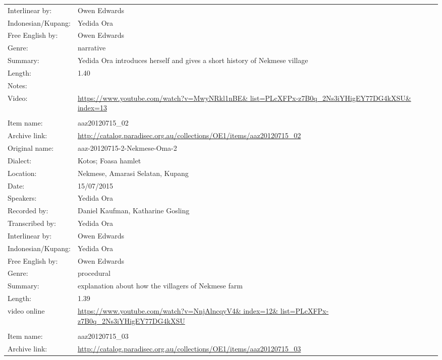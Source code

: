 \begin{longtable}{lL{.67\textwidth}}
Interlinear by:		& Owen Edwards \\
Indonesian/Kupang:		& Yedida Ora \\
Free English by:		& Owen Edwards \\
Genre:				& narrative \\
\clearpage
Summary:				& Yedida Ora introduces herself and gives a short history of Nekmese{\Q} village \\
Length:				& 1.40 \\
Notes:				& \\
Video: & \url{https://www.youtube.com/watch?v=MwyNRkl1nBE& list=PLcXFPx-z7B0q_2Ns3iYHigEY77DG4kXSU& index=13} \\ \lspbottomrule
{}			& \\
Item name:			& aaz20120715{\_}02\\
Archive link:			& \url{http://catalog.paradisec.org.au/collections/OE1/items/aaz20120715_02}\\
Original name:			& aaz-20120715-2-Nekmese-Oma-2\\
Dialect:				& Kotos; Fo{\Q}asa{\Q} hamlet \\
Location:				& Nekmese{\Q}, Amarasi Selatan, Kupang \\
Date:				& 15/07/2015 \\
Speakers:				& Yedida Ora \\
Recorded by:			& Daniel Kaufman, Katharine Gosling \\
Transcribed by:		& Yedida Ora \\
Interlinear by:		& Owen Edwards \\
Indonesian/Kupang:		& Yedida Ora \\
Free English by:		& Owen Edwards \\
Genre:				& procedural \\
Summary:				& explanation about how the villagers of Nekmese{\Q} farm\\
Length:				& 1.39\\
video online & \url{https://www.youtube.com/watch?v=NnjAlncqyV4& index=12& list=PLcXFPx-z7B0q_2Ns3iYHigEY77DG4kXSU}\\ \lspbottomrule
{}			& \\
Item name:			& aaz20120715{\_}03\\
Archive link:			& \url{http://catalog.paradisec.org.au/collections/OE1/items/aaz20120715_03}\\

\end{longtable}
